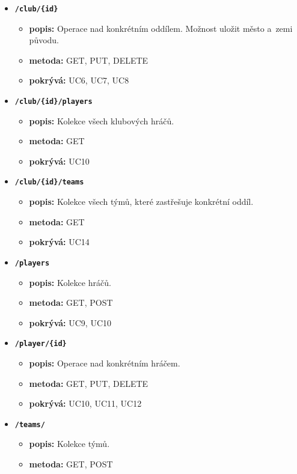 \begin{itemize}
\begin{itemize}
  \end{itemize}
  \item \texttt{\textbf{/club/\{id\}}}
  \begin{itemize}
    \item \textbf{popis:} Operace nad konkrétním oddílem. Možnost uložit město a~zemi původu.
    \item \textbf{metoda:} GET, PUT, DELETE
    \item \textbf{pokrývá:} UC6, UC7, UC8
  \end{itemize}
  \item \texttt{\textbf{/club/\{id\}/players}}
  \begin{itemize}
    \item \textbf{popis:} Kolekce všech klubových hráčů.
    \item \textbf{metoda:} GET
    \item \textbf{pokrývá:} UC10
  \end{itemize}
  \item \texttt{\textbf{/club/\{id\}/teams}}
  \begin{itemize}
    \item \textbf{popis:} Kolekce všech týmů, které zastřešuje konkrétní oddíl.
    \item \textbf{metoda:} GET
    \item \textbf{pokrývá:} UC14
  \end{itemize}
  \item \texttt{\textbf{/players}}
  \begin{itemize}
    \item \textbf{popis:} Kolekce hráčů.
    \item \textbf{metoda:} GET, POST
    \item \textbf{pokrývá:} UC9, UC10
  \end{itemize}
  \item \texttt{\textbf{/player/\{id\}}}
  \begin{itemize}
    \item \textbf{popis:} Operace nad konkrétním hráčem.
    \item \textbf{metoda:} GET, PUT, DELETE
    \item \textbf{pokrývá:} UC10, UC11, UC12
  \end{itemize}
  \pagebreak
  \item \texttt{\textbf{/teams/}}
  \begin{itemize}
    \item \textbf{popis:} Kolekce týmů.
    \item \textbf{metoda:} GET, POST

\end{itemize}
\end{itemize}
